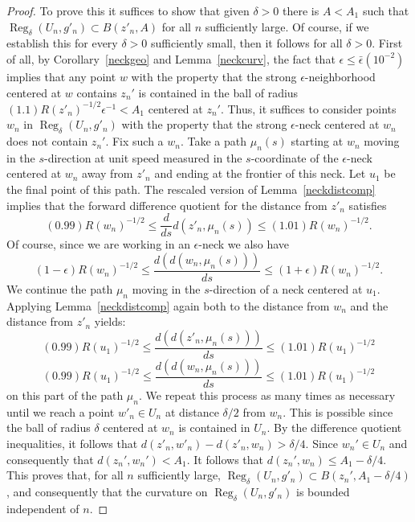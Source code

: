\begin{proof}
To prove this it suffices to show that given $\delta>0$ there is
$A<A_1$ such that $\operatorname{Reg}_\delta(U_n,g'_n)\subset B(z'_n,A)$ for
all $n$ sufficiently large. Of course, if we establish this for
every $\delta>0$ sufficiently small, then it follows for all
$\delta>0$. First of all, by Corollary~\ref{neckgeo} and
Lemma~\ref{neckcurv}, the fact that $\epsilon\le
\bar\epsilon(10^{-2})$ implies that any point $w$ with the property
that the strong $\epsilon$-neighborhood centered at $w$ contains
$z_n'$ is contained in the ball of radius
$(1.1)R(z'_n)^{-1/2}\epsilon^{-1}<A_1$ centered at $z_n'$. Thus, it
suffices to consider points $w_n$ in $\operatorname{Reg}_\delta(U_n,g'_n)$
with the property that the strong $\epsilon$-neck centered at $w_n$
does not contain $z_n'$. Fix such a $w_n$. Take a path $\mu_n(s)$
starting at $w_n$ moving in the $s$-direction at unit speed measured
in the $s$-coordinate of the $\epsilon$-neck centered at $w_n$ away
from $z'_n$ and ending at the frontier of this neck. Let $u_1$ be
the final point of this path. The rescaled version of
Lemma~\ref{neckdistcomp} implies that the forward difference
quotient for the distance from $z'_n$ satisfies
$$(0.99)R(w_n)^{-1/2}\le \frac{d}{ds}d(z'_n,\mu_n(s))
\le (1.01)R(w_n)^{-1/2}.$$ Of course, since we are working in an
$\epsilon$-neck we also have
$$(1-\epsilon)R(w_n)^{-1/2}\le \frac{d(d(w_n,\mu_n(s)))}{ds}\le
(1+\epsilon)R(w_n)^{-1/2}.$$  We continue the path $\mu_n$ moving in
the $s$-direction of a neck centered at $u_1$. Applying
Lemma~\ref{neckdistcomp} again both to the distance from $w_n$ and
the distance from $z'_n$ yields:
$$(0.99)R(u_1)^{-1/2}\le \frac{d(d(z'_n,\mu_n(s)))}
{ds}\le (1.01)R(u_1)^{-1/2}$$
$$(0.99)R(u_1)^{-1/2}\le \frac{d(d(w_n,\mu_n(s)))}
{ds}\le (1.01)R(u_1)^{-1/2}$$ on this part of the path $\mu_n$. We
repeat this process as many times as necessary until we reach a
point $w'_n\in U_n$ at distance $\delta/2$ from $w_n$. This is
possible since the ball of radius $\delta$ centered at $w_n$ is
contained in $U_n$. By the difference quotient inequalities, it
follows that $d(z'_n,w'_n)-d(z'_n,w_n)>\delta/4$.
 Since $w_n'\in U_n$ and
consequently that $d(z_n',w_n')<A_1$. It follows that
$d(z_n',w_n)\le A_1-\delta/4$. This proves that, for all $n$
sufficiently large, $\operatorname{Reg}_\delta(U_n,g'_n)\subset
B(z_n',A_1-\delta/4)$, and consequently that the curvature on
$\operatorname{Reg}_\delta(U_n,g'_n)$ is bounded independent of $n$.
\end{proof}

